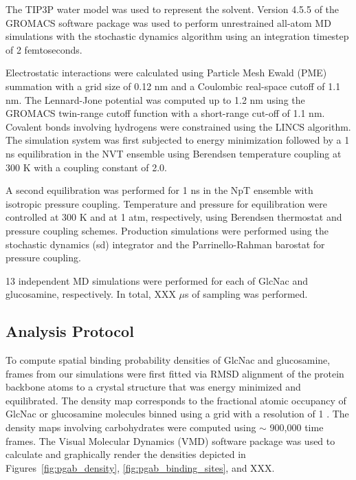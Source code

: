 
The TIP3P water model was used to represent the solvent. Version 4.5.5 of the GROMACS software package\cite{Pronk:2013ef,Hess:2008p5353} was used to perform unrestrained all-atom MD simulations with the stochastic dynamics algorithm using an integration timestep of 2 femtoseconds.

Electrostatic interactions were calculated using Particle Mesh Ewald (PME) summation with a grid size of 0.12 nm and a Coulombic real-space cutoff of 1.1 nm. The Lennard-Jone potential was computed up to 1.2 nm using the GROMACS twin-range cutoff function with a short-range cut-off of 1.1 nm. Covalent bonds involving hydrogens were constrained using the LINCS algorithm. The simulation system was first subjected to energy minimization followed by a 1 ns equilibration in the NVT ensemble using Berendsen temperature coupling at 300 K with a coupling constant of 2.0.

A second equilibration was performed for 1 ns in the NpT ensemble with isotropic pressure coupling. Temperature and pressure for equilibration were controlled at 300 K and at 1 atm, respectively, using Berendsen thermostat and pressure coupling schemes. Production simulations were performed using the stochastic dynamics (sd) integrator and the Parrinello-Rahman barostat for pressure coupling.

13 independent MD simulations were performed for each of GlcNac and glucosamine, respectively. In total, XXX $\mu$s of sampling was performed.

\subsection*{Analysis Protocol}
To compute spatial binding probability densities of GlcNac and glucosamine, frames from our simulations were first fitted via RMSD alignment of the protein backbone atoms to a crystal structure that was energy minimized and equilibrated. The density map corresponds to the fractional atomic occupancy of GlcNac or glucosamine molecules binned using a grid with a resolution of 1 \angstrom.  The density maps involving carbohydrates were computed using  $\sim$ 900,000 time frames. The Visual Molecular Dynamics (VMD) software package\cite{Humphrey:1996to} was used to calculate and graphically render the densities depicted in Figures~\ref{fig:pgab_density}, \ref{fig:pgab_binding_sites}, and XXX.

